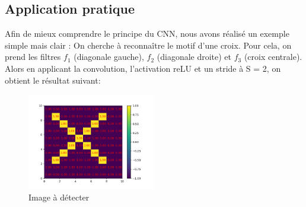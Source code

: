 \subsection{Application pratique}

Afin de mieux comprendre le principe du CNN, nous avons réalisé un exemple simple mais clair : 
On cherche à reconnaître le motif d'une croix. 
Pour cela, on prend les filtres $f_1$ (diagonale gauche), $f_2$ (diagonale droite) et $f_3$ (croix centrale).
Alors en applicant la convolution, l'activation reLU et un stride à S = 2, on obtient le résultat suivant:

\begin{figure}[h]

    \center
    \includegraphics[width=0.5\textwidth]{img/cnn_exemple/cross/image_croix.png}
    \caption{Image à détecter}
\end{figure}

